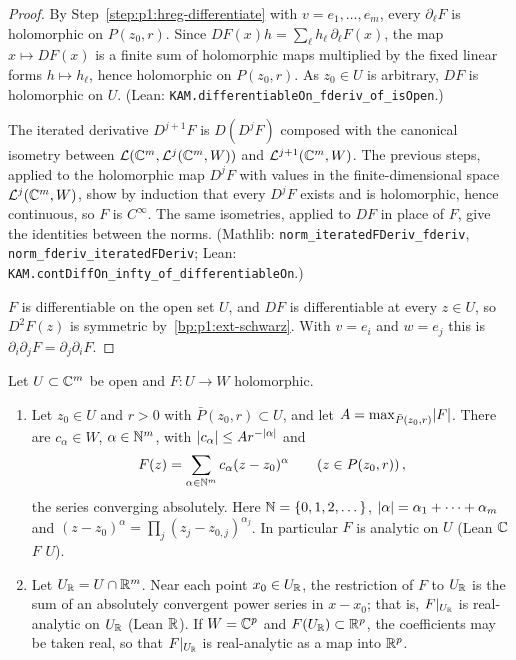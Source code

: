 \begin{proof}
\label{step:p1:hreg-full}
By Step~\ref{step:p1:hreg-differentiate} with $v=e_1,\dots,e_m$, every $\partial_\ell F$ is holomorphic
on $P(z_0,r)$. Since $DF(x)h=\sum_\ell h_\ell\,\partial_\ell F(x)$, the map $x\mapsto DF(x)$ is a finite
sum of holomorphic maps multiplied by the fixed linear forms $h\mapsto h_\ell$, hence holomorphic on
$P(z_0,r)$. As $z_0\in U$ is arbitrary, $DF$ is holomorphic on $U$. (Lean:
\nolinkurl{KAM.differentiableOn_fderiv_of_isOpen}.)

\label{step:p1:hreg-orders}
The iterated derivative $D^{j+1}F$ is $D(D^jF)$ composed with the canonical isometry between
$\mathcal L(\mathbb{C}^m,\mathcal L^j(\mathbb{C}^m,W))$ and $\mathcal L^{j+1}(\mathbb{C}^m,W)$. The previous steps, applied to
the holomorphic map $D^jF$ with values in the finite-dimensional space $\mathcal L^j(\mathbb{C}^m,W)$, show by
induction that every $D^jF$ exists and is holomorphic, hence continuous, so $F$ is $C^\infty$. The same
isometries, applied to $DF$ in place of $F$, give the identities between the norms. (Mathlib:
\nolinkurl{norm_iteratedFDeriv_fderiv}, \nolinkurl{norm_fderiv_iteratedFDeriv}; Lean:
\nolinkurl{KAM.contDiffOn_infty_of_differentiableOn}.)

\label{step:p1:hreg-symmetry}
$F$ is differentiable on the open set $U$, and $DF$ is differentiable at every $z\in U$, so $D^2F(z)$ is
symmetric by~\ref{bp:p1:ext-schwarz}. With $v=e_i$ and $w=e_j$ this is
$\partial_i\partial_jF=\partial_j\partial_iF$.
\end{proof}

\begin{lemma}\label{bp:p1:holomorphic-analytic}
Let $U\subset\mathbb{C}^m$ be open and $F:U\to W$ holomorphic.
\begin{enumerate}[label=(\alph*)]
\item Let $z_0\in U$ and $r>0$ with $\bar P(z_0,r)\subset U$, and let $A=\max_{\bar P(z_0,r)}\lvert F\rvert$.
  There are $c_\alpha\in W$, $\alpha\in\mathbb{N}^m$, with $\lvert c_\alpha\rvert\le Ar^{-\lvert \alpha\rvert}$ and
  \begin{equation*}
  F(z)=\sum_{\alpha\in\mathbb{N}^m}c_\alpha(z-z_0)^\alpha\qquad(z\in P(z_0,r))\,,
  \end{equation*}
  the series converging absolutely. Here $\mathbb{N}=\{0,1,2,\dots\}$, $\lvert \alpha\rvert=\alpha_1+\dots+\alpha_m$ and
  $(z-z_0)^\alpha=\prod_j(z_j-z_{0,j})^{\alpha_j}$. In particular $F$ is analytic on $U$ (Lean
   $\mathbb{C}$ $F$ $U$).
\item Let $U_{\mathbb{R}}=U\cap\mathbb{R}^m$. Near each point $x_0\in U_{\mathbb{R}}$, the restriction of $F$ to $U_{\mathbb{R}}$ is the sum of
  an absolutely convergent power series in $x-x_0$; that is, $F|_{U_{\mathbb{R}}}$ is real-analytic on $U_{\mathbb{R}}$
  (Lean  $\mathbb{R}$). If $W=\mathbb{C}^p$ and $F(U_{\mathbb{R}})\subset\mathbb{R}^p$, the coefficients may be taken
  real, so that $F|_{U_{\mathbb{R}}}$ is real-analytic as a map into $\mathbb{R}^p$.
\end{enumerate}
\end{lemma}

